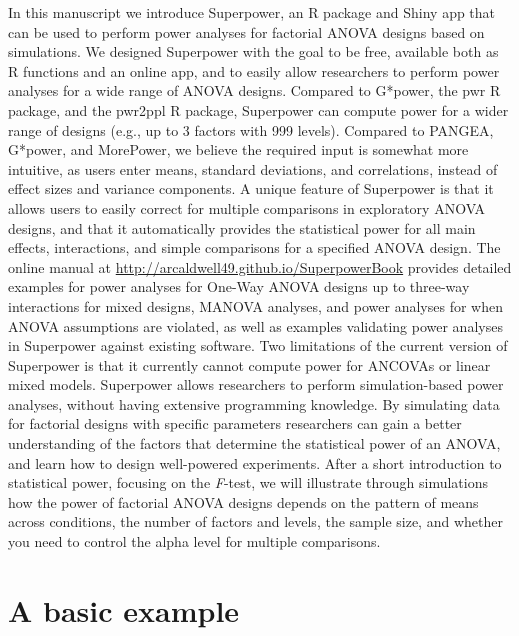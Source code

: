 \documentclass[
  ,jou,floatsintext]{apa6}
\begin{document}
In this manuscript we introduce Superpower, an R package and Shiny app that can be used to perform power analyses for factorial ANOVA designs based on simulations.
We designed Superpower with the goal to be free, available both as R functions and an online app, and to easily allow researchers to perform power analyses for a wide range of ANOVA designs.
Compared to G*power, the pwr R package, and the pwr2ppl R package, Superpower can compute power for a wider range of designs (e.g., up to 3 factors with 999 levels).
Compared to PANGEA, G*power, and MorePower, we believe the required input is somewhat more intuitive, as users enter means, standard deviations, and correlations, instead of effect sizes and variance components.
A unique feature of Superpower is that it allows users to easily correct for multiple comparisons in exploratory ANOVA designs, and that it automatically provides the statistical power for all main effects, interactions, and simple comparisons for a specified ANOVA design.
The online manual at \url{http://arcaldwell49.github.io/SuperpowerBook} provides detailed examples for power analyses for One-Way ANOVA designs up to three-way interactions for mixed designs, MANOVA analyses, and power analyses for when ANOVA assumptions are violated, as well as examples validating power analyses in Superpower against existing software.
Two limitations of the current version of Superpower is that it currently cannot compute power for ANCOVAs or linear mixed models.
Superpower allows researchers to perform simulation-based power analyses, without having extensive programming knowledge.
By simulating data for factorial designs with specific parameters researchers can gain a better understanding of the factors that determine the statistical power of an ANOVA, and learn how to design well-powered experiments.
After a short introduction to statistical power, focusing on the \emph{F}-test, we will illustrate through simulations how the power of factorial ANOVA designs depends on the pattern of means across conditions, the number of factors and levels, the sample size, and whether you need to control the alpha level for multiple comparisons.

\hypertarget{a-basic-example}{%
\section{A basic example}\label{a-basic-example}}
\end{document}
